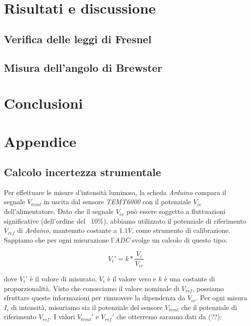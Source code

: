 \documentclass[12pt, a4paper, twoside]{article}
\begin{document}
\section{Risultati e discussione}\label{sec:risultati-e-discussione}
  \subsection{Verifica delle leggi di Fresnel}\label{subsec:leggi-di-fresnel}
    \blindtext[2]
  \subsection{Misura dell'angolo di Brewster}\label{subsec:angolo-di-brewster}
    \blindtext[2]

\section{Conclusioni}\label{sec:conclusioni}
  \blindtext[2]

\newpage
\section{Appendice}\label{sec:appendice}
  \subsection{Calcolo incertezza strumentale}\label{subsec:calcolo-incertezza-strumentale}
    Per effettuare le misure d'intensità luminosa, la scheda \emph{Arduino} compara
    il segnale $V_{temt}$ in uscita dal sensore \emph{TEMT6000} con il potenziale
    $V_{cc}$ dell'alimentatore.
    Dato che il segnale $V_{cc}$ può essere soggetto a fluttuazioni significative %
    (dell'ordine del ~10\%), abbiamo utilizzato il potenziale di riferimento
    $V_{ref}$ di \emph{Arduino}, mantenuto costante a $1.1V$, come strumento di
    calibrazione.
    Sappiamo che per ogni misurazione l'\emph{ADC} svolge un calcolo di questo tipo:

    \begin{equation}
      V_i' = k * \frac {V_i} {V_{cc}}
    \end{equation}

    \noindent dove $V_i'$ è il valore di misurato, $V_i$ è il valore vero e $k$
    è una costante di proporzionalità. Visto che conosciamo il valore nominale
    di $V_{ref}$, possiamo sfruttare queste informazioni per rimuovere la
    dipendenza da $V_{cc}$. Per ogni misura $I_i$ di intensità, misuriamo sia
    il potenziale del sensore $V_{temt}$ che il potenziale di riferimento $V_{ref}$.
    I valori $V_{temt}'$ e $V_{ref}'$ che otterremo saranno dati da (??): %
\end{document}
